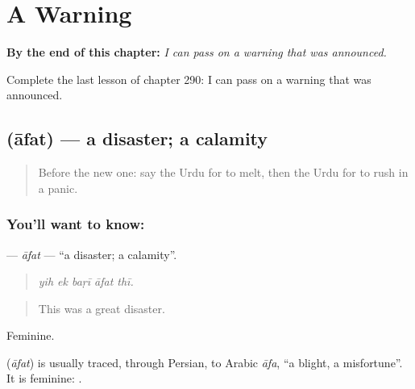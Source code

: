 
\chapter{A Warning}
\label{ch:ur-a-warning}

\begin{chapteropening}
\textbf{By the end of this chapter:} \emph{I can pass on a warning that was announced.}

Complete the last lesson of chapter 290: I can pass on a warning that was announced.
\end{chapteropening}

\section[\texorpdfstring{\ur{آفت} (āfat)}{آفت (āfat)}]{ (āfat) — a disaster; a calamity}

\label{lesson:UR-C290-afat}



\begin{quote}
Before the new one: say the Urdu for to melt, then the Urdu for to rush in a panic.
\end{quote}

\subsection*{You'll want to know: }
\textbf{} — \emph{āfat} — \textquotedblleft{}a disaster; a calamity\textquotedblright{}.

\begin{quote}
    
\end{quote}

\begin{quote}
\emph{yih ek baṛī āfat thī.}
\end{quote}

\begin{quote}
This was a great disaster.
\end{quote}

Feminine.

\begin{cousinweb}
\textbf{} (\emph{āfat}) is usually traced, through Persian, to Arabic \emph{āfa}, \textquotedblleft{}a blight, a misfortune\textquotedblright{}. It is feminine: \textbf{ }.
\end{cousinweb}

